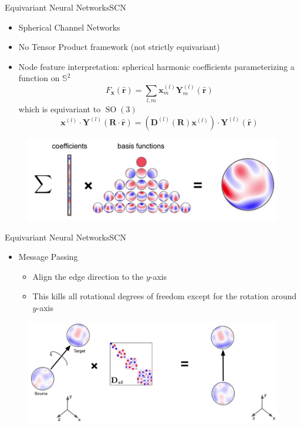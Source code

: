 \documentclass[pdf,serif]{beamer}
\begin{document}
\begin{frame}{Equivariant Neural Networks}{SCN}
    \begin{itemize}
        \item Spherical Channel Networks \citep{zitnick2022spherical}
        \item No Tensor Product framework (not strictly equivariant)
        \item Node feature interpretation: spherical harmonic coefficients parameterizing a function on $\mathbb S^2$
        $$
        F_{\mathbf{x}}(\hat{\mathbf{r}})=\sum_{l, m} \mathbf{x}_m^{(l)} \mathbf{Y}_m^{(l)}(\hat{\mathbf{r}})
        $$
        which is equivariant to $\operatorname{SO}(3)$
        $$
        \mathbf{x}^{(l)} \cdot \mathbf{Y}^{(l)}(\mathbf{R} \cdot \hat{\mathbf{r}})=\left(\mathbf{D}^{(l)}(\mathbf{R}) \mathbf{x}^{(l)}\right) \cdot \mathbf{Y}^{(l)}(\hat{\mathbf{r}})
        $$
    \end{itemize}
    \begin{figure}
        \includegraphics[width=.7\linewidth]{images/shc}
    \end{figure}
\end{frame}

\begin{frame}{Equivariant Neural Networks}{SCN}
    \begin{itemize}
        \item Message Passing
        \begin{itemize}
            \item Align the edge direction to the $y$-axis
            \item This kills all rotational degrees of freedom except for the rotation around $y$-axis
        \end{itemize}
    \end{itemize}
    \vspace*{1em}
    \begin{figure}
        \includegraphics[width=.8\linewidth]{images/rot}
    \end{figure}
\end{frame}
\end{document}

